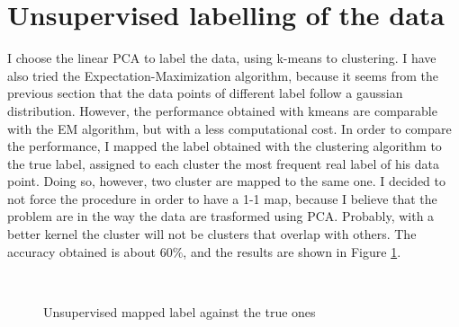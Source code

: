 \documentclass[12pt]{article}
\begin{document}
\section{Unsupervised labelling of the data}
I choose the linear PCA to label the data, using k-means to clustering. I have also tried the Expectation-Maximization algorithm, because it seems from the previous section
that the data points of different label follow a gaussian distribution. However, the performance obtained with kmeans are comparable with the EM algorithm, but with a less computational cost.
In order to compare the performance, I mapped the label obtained with the clustering algorithm to the true label, assigned to each cluster the most frequent real label of his data point.
Doing so, however, two cluster are mapped to the same one. I decided to not force the procedure in order to have a 1-1 map, because I believe that the problem are in the way the data are trasformed using PCA.
Probably, with a better kernel the cluster will not be clusters that overlap with others. The accuracy obtained is about $60\%$, and the results are shown in Figure \ref{fig:map_pca}.

\begin{figure}[htbp]
    \centering
    {}\\
    {}

    \caption{Unsupervised mapped label against the true ones}
    \label{fig:map_pca}
    
\end{figure}
 

%
\end{document}

